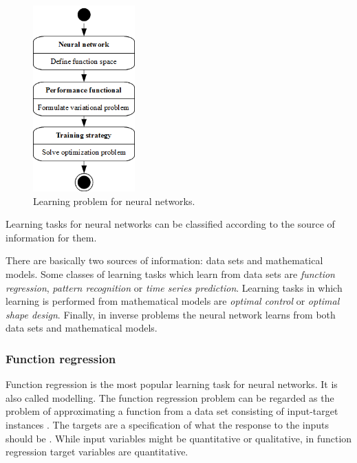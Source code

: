\begin{figure}[H]
	\begin{center}
		\includegraphics[width=0.35\textwidth]{neural_networks_basis/learning_problem}
		\caption{Learning problem for neural networks.}
		\label{LearningActivityDiagram}
	\end{center}
\end{figure}

Learning tasks for neural networks can be classified according to the source of information for them. 

There are basically two sources of information: data sets and mathematical models. 
Some classes of learning tasks which learn from data sets are \emph{function regression}, \emph{pattern recognition} or \emph{time series prediction}. 
Learning tasks in which learning is performed from mathematical models are \emph{optimal control} or \emph{optimal shape design}. 
Finally, in inverse problems the neural network learns from both data sets and mathematical models.



\subsubsection{Function regression}

Function regression is the most popular learning task for neural networks. 
It is also called modelling. The function regression problem can be regarded as the problem of
approximating a function from a data set consisting of input-target instances
\cite{Haykin1994}. The targets are a specification
of what the response to the inputs should be \cite{Bishop1995}. 
While input variables might be quantitative or qualitative, in function regression target variables are quantitative. 


